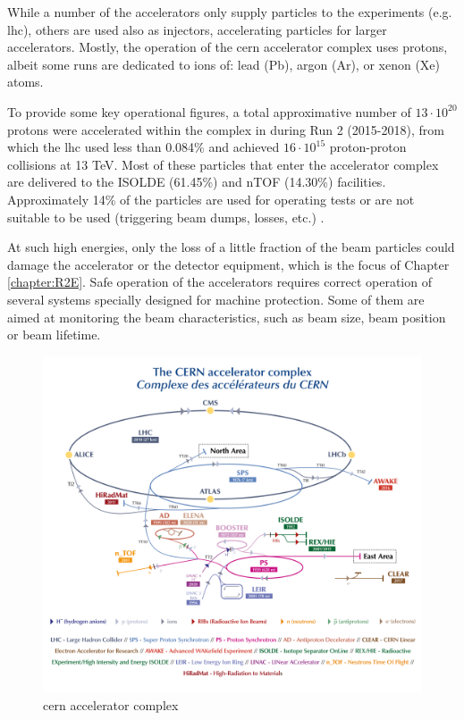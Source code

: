 \documentclass[encoding=utf8,british]{tumphthesis}
\begin{document}
While a number of the accelerators only supply particles to the experiments (e.g. \acrshort{lhc}), others are used also as injectors, accelerating particles for larger accelerators. Mostly, the operation of the \acrshort{cern} accelerator complex uses protons, albeit some runs are dedicated to ions of: lead (Pb), argon (Ar), or xenon (Xe) atoms. 

To provide some key operational figures, a total approximative number of $13\cdot10^{20}$ protons were accelerated within the complex in during Run 2 (2015-2018), from which the \acrshort{lhc} used less than 0.084\% and achieved $16\cdot10^{15}$ proton-proton collisions at 13 TeV. Most of these particles that enter the accelerator complex are delivered to the ISOLDE (61.45\%) and nTOF \cite{NTOF} (14.30\%) facilities. Approximately 14\% of the particles are used for operating tests or are not suitable to be used (triggering beam dumps, losses, etc.) \cite{CERN-annual-report-2017, CERN-annual-report-2018}.

At such high energies, only the loss of a little fraction of the beam particles could damage the accelerator or the detector equipment, which is the focus of Chapter \ref{chapter:R2E}. Safe operation of the accelerators requires correct operation of several systems specially designed for machine protection. Some of them are aimed at monitoring the beam characteristics, such as beam size, beam position or beam lifetime.

\begin{figure}[H]
    \centering
    \includegraphics[width=1.0\linewidth]{figures/CCC-v2019-final-white.png}
    \caption{\acrshort{cern} accelerator complex \cite{CERN-accelerator-complex}}
    \label{fig:CERN-accelerator-complex}
\end{figure}
\end{document}
